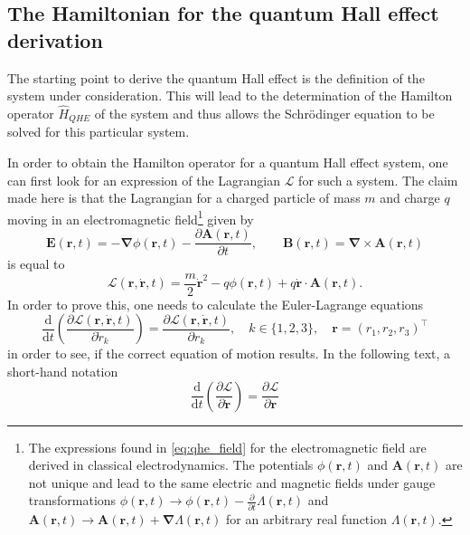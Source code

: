 \documentclass{report}
\numberwithin{tm}{section}
\newcommand\vect[1]{\ensuremath{\bm{#1}}}
\begin{document}
	\subsection{The Hamiltonian for the quantum Hall effect derivation}
	The starting point to derive the quantum Hall effect is the definition of the system under consideration. This will lead to the determination of the Hamilton operator $\hat{H}_{QHE}$ of the system and thus allows the Schrödinger equation to be solved for this particular system.
	
	In order to obtain the Hamilton operator for a quantum Hall effect system, one can first look for an expression of the Lagrangian $\mathcal{L}$ for such a system. The claim made here is that the Lagrangian for a charged particle of mass $m$ and charge $q$ moving in an electromagnetic field\footnote{The expressions found in \cref{eq:qhe_field} for the electromagnetic field are derived in classical electrodynamics. The potentials $\phi(\vect{r},t)$ and $\vect{A}(\vect{r},t)$ are not unique and lead to the same electric and magnetic fields under gauge transformations $\phi(\vect{r},t) \rightarrow \phi(\vect{r},t) - \frac{\partial}{\partial t}\Lambda(\vect{r},t)$ and $\vect{A}(\vect{r},t) \rightarrow \vect{A}(\vect{r},t) + \vect{\nabla}\Lambda(\vect{r},t)$ for an arbitrary real function $\Lambda(\vect{r},t)$.} given by \begin{equation}\label{eq:qhe_field}
		\vect{E}(\vect{r},t) = -\vect{\nabla}\phi(\vect{r},t) - \frac{\partial \vect{A}(\vect{r},t)}{\partial t}, \qquad \vect{B}(\vect{r},t) = \vect{\nabla} \times \vect{A}(\vect{r},t)
	\end{equation} is equal to \begin{equation}\label{eq:qhe_lagrangian_general_em_field}
	\mathcal{L}(\vect{r}, \dot{\vect{r}},t) = \frac{m}{2}\dot{\vect{r}}^2 - q\phi(\vect{r},t) + q\dot{\vect{r}}\cdot \vect{A}(\vect{r},t).
	\end{equation} In order to prove this, one needs to calculate the Euler-Lagrange equations \begin{equation}
	\frac{\mathrm{d}}{\mathrm{d}t}\left(\frac{\partial \mathcal{L}(\vect{r}, \dot{\vect{r}},t)}{\partial \dot{r}_k}\right) = \frac{\partial \mathcal{L}(\vect{r},\dot{\vect{r}},t)}{\partial r_k}, \quad k \in \{1,2,3\}, \quad \vect{r} = (r_1,r_2,r_3)^\top
	\end{equation} in order to see, if the correct equation of motion results. In the following text, a short-hand notation \begin{equation}
	\frac{\mathrm{d}}{\mathrm{d}t}\left(\frac{\partial \mathcal{L}}{\partial \dot{\vect{r}}}\right) = \frac{\partial\mathcal{L}}{\partial \vect{r}}

\end{equation}
\end{document}
